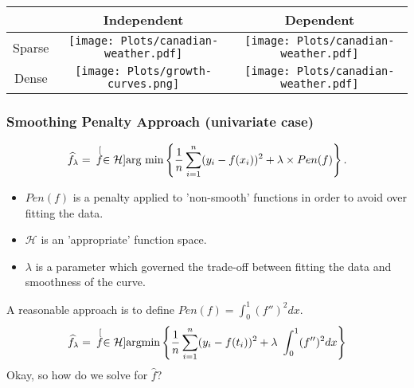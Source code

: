 \documentclass{beamer}
\renewcommand{\H}{\mathcal{H}}
\begin{document}
\begin{frame}[t]{}
	\begin{tabular}{c|c|c|}
		& Independent & Dependent \\
		\hline
		Sparse & \texttt{[image: Plots/canadian-weather.pdf]} & \texttt{[image: Plots/canadian-weather.pdf]} \\
		\hline
		Dense & \texttt{[image: Plots/growth-curves.png]} &\texttt{[image: Plots/canadian-weather.pdf]}\\
		\hline
	\end{tabular}
\end{frame}








\begin{frame}
\frametitle{Smoothing Penalty Approach (univariate case)}
\begin{equation*}
\widehat{f}_{\lambda} = \hspace{.07in}\stackrel[f \in \H]{}{\mbox{arg min}} \left\{ \frac{1}{n}\sum_{i=1}^{n}(y_i - f(x_i))^2 + \lambda\times Pen(f) \right\}.
\label{eq:PLS_norm}
\end{equation*}
\begin{itemize}
\item $Pen(f)$ is a penalty applied to 'non-smooth' functions in order to avoid over fitting the data.
\item $\H$ is an 'appropriate' function space.
\item $\lambda$ is a parameter which governed the trade-off between fitting the data and smoothness of the curve.
\end{itemize}
A reasonable approach is to define $Pen(f) = \int_0^1 (f'')^2dx$. 
\begin{equation*}
\widehat{f}_{\lambda} = \hspace{.07in}\stackrel[f \in \H]{}{\mbox{argmin}} \left\{ \frac{1}{n}\sum_{i=1}^{n}(y_i - f(t_i))^2 + \lambda\ \int_0^1(f'')^2dx \right\}
\label{eq:unpenalized objective function}
\end{equation*}
Okay, so how do we solve for $\hat{f}$?
\end{frame}
\end{document}
